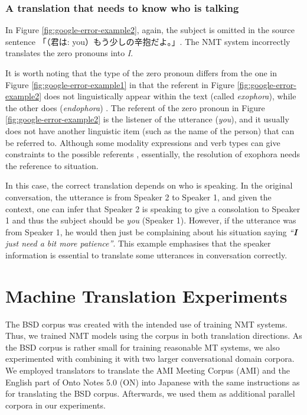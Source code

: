 \documentclass[11pt,a4paper]{article}
\begin{document}
\begin{CJK}{UTF8}{min}

\subsubsection*{A translation that needs to know who is talking}
In Figure \ref{fig:google-error-example2}, again, the subject is omitted in the source sentence 「（君は: you）もう少しの辛抱だよ。」. The NMT system incorrectly translates the zero pronouns into {\it I}.

It is worth noting that the type of the zero pronoun differs from the one in Figure \ref{fig:google-error-example1} in that the referent in Figure \ref{fig:google-error-example2} does not linguistically appear within the text (called {\it exophora}), while the other does ({\it endophora}) \citep{Brown:1983wy}. The referent of the zero pronoun in Figure \ref{fig:google-error-example2} is the listener of the utterance ({\it you}), and it usually does not have another linguistic item (such as the name of the person) that can be referred to. Although some modality expressions and verb types can give constraints to the possible referents \citep{Nakaiwa:1996vb}, essentially, the resolution of exophora needs the reference to situation.


In this case, the correct translation depends on who is speaking. In the original conversation, the utterance is from Speaker 2 to Speaker 1, and given the context, one can infer that Speaker 2 is speaking to give a consolation to Speaker 1 and thus the subject should be {\it you} (Speaker 1). However, if the utterance was from Speaker 1, he would then just be complaining about his situation saying {\it ``{\bf I} just need a bit more patience''}. This example emphasises that the speaker information is essential to translate some utterances in conversation correctly.

\end{CJK}

\section{Machine Translation Experiments}
\label{sec:mt-exp}

The BSD corpus was created with the intended use of training NMT systems. Thus, we trained NMT models using the corpus in both translation directions. As the BSD corpus is rather small for training reasonable MT systems, we also experimented with combining it with two larger conversational domain corpora. We employed translators to translate the AMI Meeting Corpus \cite{mccowan2005ami} (AMI) and the English part of Onto Notes 5.0 \cite{weischedel2013ontonotes} (ON) into Japanese with the same instructions as for translating the BSD corpus. Afterwards, we used them as additional parallel corpora in our experiments.
\end{document}
